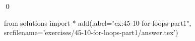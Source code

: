 
\begin{ex}
  \label{ex:45-10-for-loops-part1}
  
  \qed
\end{ex}
\begin{python0}
from solutions import *
add(label="ex:45-10-for-loops-part1",
    srcfilename='exercises/45-10-for-loops-part1/answer.tex')
\end{python0}
